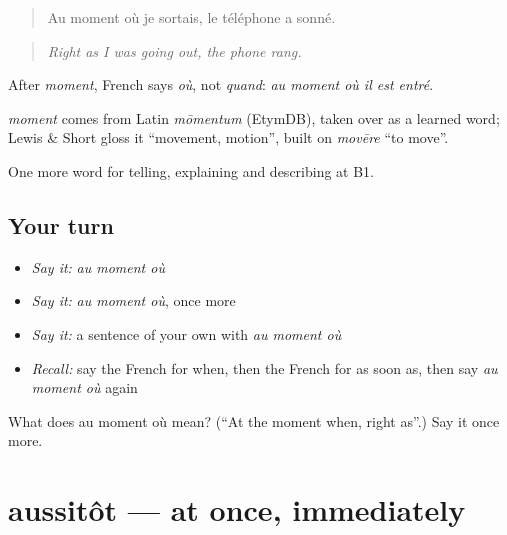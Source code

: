 \begin{quote}
Au moment où je sortais, le téléphone a sonné.
\end{quote}

\begin{quote}
\emph{Right as I was going out, the phone rang.}
\end{quote}

After \emph{moment}, French says \emph{où}, not \emph{quand}: \emph{au moment où il est entré}.

\begin{cousinweb}
\emph{moment} comes from Latin \emph{mōmentum} (EtymDB), taken over as a learned word; Lewis \& Short gloss it \textquotedblleft{}movement, motion\textquotedblright{}, built on \emph{movēre} \textquotedblleft{}to move\textquotedblright{}.
\end{cousinweb}

\begin{grammarlens}[title={What you've built}]
One more word for telling, explaining and describing at B1.
\end{grammarlens}

\subsection*{Your turn}
\begin{itemize}
\raggedright
  \item \emph{Say it:} \emph{au moment où}
  \item \emph{Say it:} \emph{au moment où}, once more
  \item \emph{Say it:} a sentence of your own with \emph{au moment où}
  \item \emph{Recall:} say the French for when, then the French for as soon as, then say \emph{au moment où} again
\end{itemize}

\begin{tcolorbox}[breakable,colback=teal!4,colframe=teal!35!black,title={Before you move on}]
What does au moment où mean? (\textquotedblleft{}At the moment when, right as\textquotedblright{}.) Say it once more.
\end{tcolorbox}
\section[aussitôt]{aussitôt — at once, immediately}

\label{lesson:FR-C269-aussitot}



